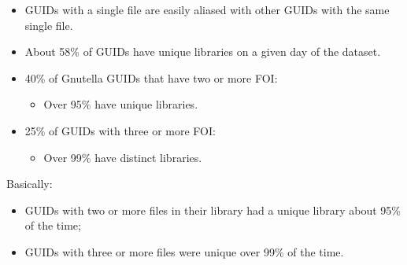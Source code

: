 \documentclass[notes]{beamer}
\begin{document}
\begin{frame}

\begin{itemize}

\item[\checkmark]GUIDs with a single file are easily aliased with other GUIDs with the same single file.

\item[\checkmark]About 58\% of GUIDs have unique libraries on a
given day of the dataset.

\end{itemize}

\end{frame}

\begin{frame}

\begin{itemize}

\item[\checkmark]40\% of Gnutella GUIDs that have two or more FOI:
	\begin{itemize}
	\item Over 95\% have unique libraries.
	\end{itemize}

\item[\checkmark]25\% of GUIDs with three or more FOI: 
	\begin{itemize}
	\item Over 99\% have distinct libraries.
	\end{itemize}

\end{itemize}

\end{frame}

\begin{frame}

\begin{block}{Basically:}

\begin{itemize}

\item[\checkmark]GUIDs with two or more files in their library had a unique library about 95\% of the time;

\item[\checkmark]GUIDs with three or more files were unique over 99\% of the time.

\end{itemize}

\end{block}

\end{frame}
\end{document}
